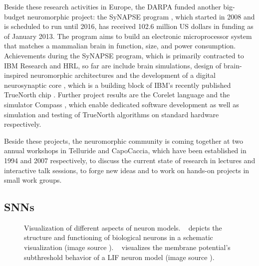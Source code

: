 Beside these research activities in Europe, the \ac{DARPA} funded another big-budget neuromorphic project: the \ac{SyNAPSE} program \cite{SYNAPSE-proj, Srinivasa2012}, which started in 2008 and is scheduled to run until 2016, has received 102.6 million US dollars in funding as of January 2013.
The program aims to build an electronic microprocessor system that matches a mammalian brain in function, size, and power consumption.
Achievements during the \ac{SyNAPSE} program, which is primarily contracted to IBM Research and \acs{HRL}, so far are include brain simulations, design of brain-inspired neuromorphic architectures \cite{Nere2012} and the development of a digital neurosynaptic core \cite{Merolla2011}, which is a building block of IBM's recently published TrueNorth chip \cite{Akopyan2015}.
Further project results are the Corelet language \cite{Amir2013} and the simulator Compass \cite{Preissl2012}, which enable dedicated software development as well as simulation and testing of TrueNorth algorithms on standard hardware respectively.

Beside these projects, the neuromorphic community is coming together at two annual  workshops in Telluride and CapoCaccia, which have been established in 1994 and 2007 respectively, to discuss the current state of research in lectures and interactive talk sessions, to forge new ideas and to work on hands-on projects in small work groups.

\subsection{\aclp{SNN}}
\label{subsec:SNN}
\begin{figure}[t!]
	\centering
    \caption{Visualization of different aspects of neuron models. ~\protect{} depicts the structure and functioning of biological neurons in a schematic visualization (image source \cite{Gerstner2002}). ~\protect{} visualizes the membrane potential's subthreshold behavior of a \ac{LIF} neuron model (image source \cite{Masquelier2007}).}\label{fig:neuron_models}
\end{figure}


